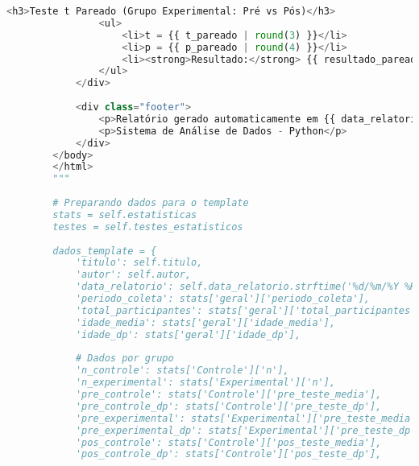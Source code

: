 \begin{pythonbox}
\begin{lstlisting}[language=Python]                       
                <h3>Teste t Pareado (Grupo Experimental: Pré vs Pós)</h3>
                <ul>
                    <li>t = {{ t_pareado | round(3) }}</li>
                    <li>p = {{ p_pareado | round(4) }}</li>
                    <li><strong>Resultado:</strong> {{ resultado_pareado }}</li>
                </ul>
            </div>
            
            <div class="footer">
                <p>Relatório gerado automaticamente em {{ data_relatorio }}</p>
                <p>Sistema de Análise de Dados - Python</p>
            </div>
        </body>
        </html>
        """
        
        # Preparando dados para o template
        stats = self.estatisticas
        testes = self.testes_estatisticos
        
        dados_template = {
            'titulo': self.titulo,
            'autor': self.autor,
            'data_relatorio': self.data_relatorio.strftime('%d/%m/%Y %H:%M'),
            'periodo_coleta': stats['geral']['periodo_coleta'],
            'total_participantes': stats['geral']['total_participantes'],
            'idade_media': stats['geral']['idade_media'],
            'idade_dp': stats['geral']['idade_dp'],
            
            # Dados por grupo
            'n_controle': stats['Controle']['n'],
            'n_experimental': stats['Experimental']['n'],
            'pre_controle': stats['Controle']['pre_teste_media'],
            'pre_controle_dp': stats['Controle']['pre_teste_dp'],
            'pre_experimental': stats['Experimental']['pre_teste_media'],
            'pre_experimental_dp': stats['Experimental']['pre_teste_dp'],
            'pos_controle': stats['Controle']['pos_teste_media'],
            'pos_controle_dp': stats['Controle']['pos_teste_dp'],

   \end{lstlisting}
\end{pythonbox}

